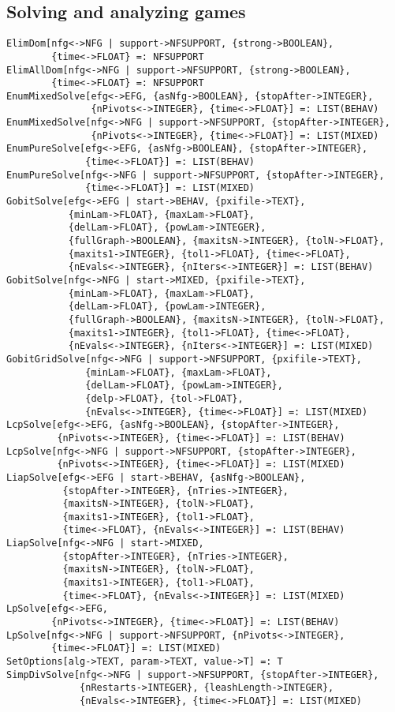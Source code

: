 \subsection{Solving and analyzing games}

\begin{verbatim}
ElimDom[nfg<->NFG | support->NFSUPPORT, {strong->BOOLEAN}, 
        {time<->FLOAT} =: NFSUPPORT
ElimAllDom[nfg<->NFG | support->NFSUPPORT, {strong->BOOLEAN}, 
        {time<->FLOAT} =: NFSUPPORT
EnumMixedSolve[efg<->EFG, {asNfg->BOOLEAN}, {stopAfter->INTEGER},
               {nPivots<->INTEGER}, {time<->FLOAT}] =: LIST(BEHAV)
EnumMixedSolve[nfg<->NFG | support->NFSUPPORT, {stopAfter->INTEGER},
               {nPivots<->INTEGER}, {time<->FLOAT}] =: LIST(MIXED)
EnumPureSolve[efg<->EFG, {asNfg->BOOLEAN}, {stopAfter->INTEGER},
              {time<->FLOAT}] =: LIST(BEHAV)
EnumPureSolve[nfg<->NFG | support->NFSUPPORT, {stopAfter->INTEGER}, 
              {time<->FLOAT}] =: LIST(MIXED) 
GobitSolve[efg<->EFG | start->BEHAV, {pxifile->TEXT},
           {minLam->FLOAT}, {maxLam->FLOAT},
           {delLam->FLOAT}, {powLam->INTEGER},
           {fullGraph->BOOLEAN}, {maxitsN->INTEGER}, {tolN->FLOAT},
           {maxits1->INTEGER}, {tol1->FLOAT}, {time<->FLOAT},
           {nEvals<->INTEGER}, {nIters<->INTEGER}] =: LIST(BEHAV)
GobitSolve[nfg<->NFG | start->MIXED, {pxifile->TEXT},
           {minLam->FLOAT}, {maxLam->FLOAT},
           {delLam->FLOAT}, {powLam->INTEGER},
           {fullGraph->BOOLEAN}, {maxitsN->INTEGER}, {tolN->FLOAT},
           {maxits1->INTEGER}, {tol1->FLOAT}, {time<->FLOAT},
           {nEvals<->INTEGER}, {nIters<->INTEGER}] =: LIST(MIXED)
GobitGridSolve[nfg<->NFG | support->NFSUPPORT, {pxifile->TEXT},
              {minLam->FLOAT}, {maxLam->FLOAT}, 
              {delLam->FLOAT}, {powLam->INTEGER}, 
              {delp->FLOAT}, {tol->FLOAT},
              {nEvals<->INTEGER}, {time<->FLOAT}] =: LIST(MIXED)
LcpSolve[efg<->EFG, {asNfg->BOOLEAN}, {stopAfter->INTEGER},
         {nPivots<->INTEGER}, {time<->FLOAT}] =: LIST(BEHAV)
LcpSolve[nfg<->NFG | support->NFSUPPORT, {stopAfter->INTEGER},
         {nPivots<->INTEGER}, {time<->FLOAT}] =: LIST(MIXED)
LiapSolve[efg<->EFG | start->BEHAV, {asNfg->BOOLEAN},
          {stopAfter->INTEGER}, {nTries->INTEGER},
          {maxitsN->INTEGER}, {tolN->FLOAT},
          {maxits1->INTEGER}, {tol1->FLOAT},
          {time<->FLOAT}, {nEvals<->INTEGER}] =: LIST(BEHAV)
LiapSolve[nfg<->NFG | start->MIXED, 
          {stopAfter->INTEGER}, {nTries->INTEGER},
          {maxitsN->INTEGER}, {tolN->FLOAT},
          {maxits1->INTEGER}, {tol1->FLOAT},
          {time<->FLOAT}, {nEvals<->INTEGER}] =: LIST(MIXED)
LpSolve[efg<->EFG,
        {nPivots<->INTEGER}, {time<->FLOAT}] =: LIST(BEHAV)
LpSolve[nfg<->NFG | support->NFSUPPORT, {nPivots<->INTEGER},
        {time<->FLOAT}] =: LIST(MIXED)
SetOptions[alg->TEXT, param->TEXT, value->T] =: T
SimpDivSolve[nfg<->NFG | support->NFSUPPORT, {stopAfter->INTEGER}, 
             {nRestarts->INTEGER}, {leashLength->INTEGER},
             {nEvals<->INTEGER}, {time<->FLOAT}] =: LIST(MIXED)
\end{verbatim}

